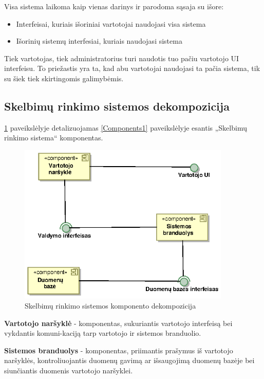 \documentclass[12pt]{article}
\begin{document}
	 Visa sistema laikoma kaip vienas darinys ir parodoma sąsaja su išore:
	
	\begin{itemize}	
		\item Interfeisai, kuriais išoriniai vartotojai naudojasi visa sistema
		\item Išorinių sistemų interfesiai, kuriais naudojasi sistema
	\end{itemize}
	
	Tiek vartotojas, tiek administratorius turi naudotis tuo pačiu vartotojo UI interfeisu. To priežastis yra ta, kad abu vartotojai naudojasi ta pačia sistema, tik su šiek tiek skirtingomis galimybėmis.	
	\pagebreak

	\subsection{Skelbimų rinkimo sistemos dekompozicija}
	 \ref{Components2} paveikslėlyje detalizuojamas \ref{Components1} paveikslėlyje esantis „Skelbimų rinkimo sistema“ komponentas.
	\begin{figure}[h]
		\begin{center}
			\includegraphics[width=0.9\textwidth]{Komponentai2.eps}
			\caption{Skelbimų rinkimo sistemos komponento dekompozicija\label{Components2}}
		\end{center}
	\end{figure}

	\textbf{Vartotojo naršyklė} - komponentas, sukuriantis vartotojo interfeisą bei vykdantis komuni-kaciją tarp vartotojo ir sistemos branduolio.

	
	\textbf{Sistemos branduolys} - komponentas, priimantis prašymus iš vartotojo naršyklės, kontroliuojantis duomenų gavimą ar išsaugojimą duomenų bazėje bei siunčiantis duomenis vartotojo naršyklei.
\end{document}
